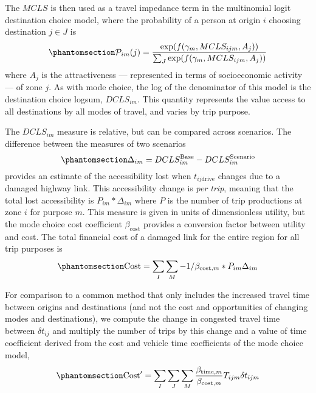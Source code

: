 \documentclass[]{ascelike-new}
\begin{document}
The \(MCLS\) is then used as a travel impedance term in the multinomial
logit destination choice model, where the probability of a person at
origin \(i\) choosing destination \(j \in J\) is
\begin{equation}\phantomsection\label{eq-dcp}{
\mathcal{P}_{im}(j) = \frac{\exp(f(\gamma_{m}, MCLS_{ijm}, A_j))}{\sum_{J}\exp(f(\gamma_{m}, MCLS_{ijm}, A_j))}
}\end{equation} where \(A_j\) is the attractiveness --- represented in
terms of socioeconomic activity --- of zone \(j\). As with mode choice,
the log of the denominator of this model is the destination choice
logsum, \(DCLS_{im}\). This quantity represents the value access to all
destinations by all modes of travel, and varies by trip purpose.

The \(DCLS_{im}\) measure is relative, but can be compared across
scenarios. The difference between the measures of two scenarios
\begin{equation}\phantomsection\label{eq-deltas}{
\Delta_{im} = DCLS_{im}^{\mathrm{Base}} - DCLS_{im}^{\mathrm{Scenario}}
}\end{equation} provides an estimate of the accessibility lost when
\(t_{ij\mathrm{drive}}\) changes due to a damaged highway link. This
accessibility change is \emph{per trip}, meaning that the total lost
accessibility is \(P_{im} * \Delta_{im}\) where \(P\) is the number of
trip productions at zone \(i\) for purpose \(m\). This measure is given
in units of dimensionless utility, but the mode choice cost coefficient
\(\beta_{\mathrm{cost}}\) provides a conversion factor between utility
and cost. The total financial cost of a damaged link for the entire
region for all trip purposes is
\begin{equation}\phantomsection\label{eq-totalcost}{
\mathrm{Cost} = \sum_{I}\sum_{M} -1 / \beta_{\mathrm{cost},m} * P_{im} \Delta_{im}
}\end{equation}

For comparison to a common method that only includes the increased
travel time between origins and destinations (and not the cost and
opportunities of changing modes and destinations), we compute the change
in congested travel time between \(\delta t_{ij}\) and multiply the
number of trips by this change and a value of time coefficient derived
from the cost and vehicle time coefficients of the mode choice model,
\begin{equation}\phantomsection\label{eq-ttmethod}{
\mathrm{Cost}' =  \sum_I \sum_J \sum_M \frac{\beta_{\mathrm{time}, m} }{\beta_{\mathrm{cost}, m}} T_{ijm} \delta t_{ijm}
}\end{equation}
\end{document}
